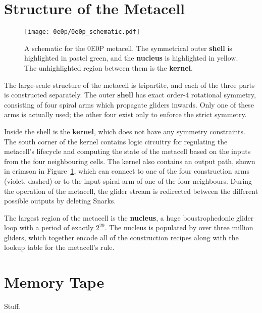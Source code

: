 

\section{Structure of the Metacell}

\begin{figure}[htb]
	\centering
	\texttt{[image: 0e0p/0e0p\_schematic.pdf]}
	\caption{A schematic for the 0E0P metacell. The symmetrical outer
		\textbf{shell} is highlighted in pastel green, and the \textbf{nucleus}
		is highlighted in yellow. The unhighlighted region between them is the
		\textbf{kernel}.}\label{fig:0e0p_schematic}
\end{figure}

The large-scale structure of the metacell is tripartite, and each of the
three parts is constructed separately. The outer \textbf{shell} has exact
order-4 rotational symmetry, consisting of four spiral arms which propagate
gliders inwards. Only one of these arms is actually used; the other four
exist only to enforce the strict symmetry.

Inside the shell is the \textbf{kernel}, which does not have any symmetry
constraints. The south corner of the kernel contains logic circuitry for
regulating the metacell's lifecycle and computing the state of the metacell
based on the inputs from the four neighbouring cells. The kernel also contains
an output path, shown in crimson in Figure~\ref{fig:0e0p_schematic}, which
can connect to one of the four construction arms (violet, dashed) or to the
input spiral arm of one of the four neighbours. During the operation of the
metacell, the glider stream is redirected between the different possible
outputs by deleting Snarks.

The largest region of the metacell is the \textbf{nucleus}, a huge
boustrophedonic glider loop with a period of exactly $2^{29}$. The nucleus
is populated by over three million gliders, which together encode all of
the construction recipes along with the lookup table for the metacell's rule.

\section{Memory Tape}

Stuff.

